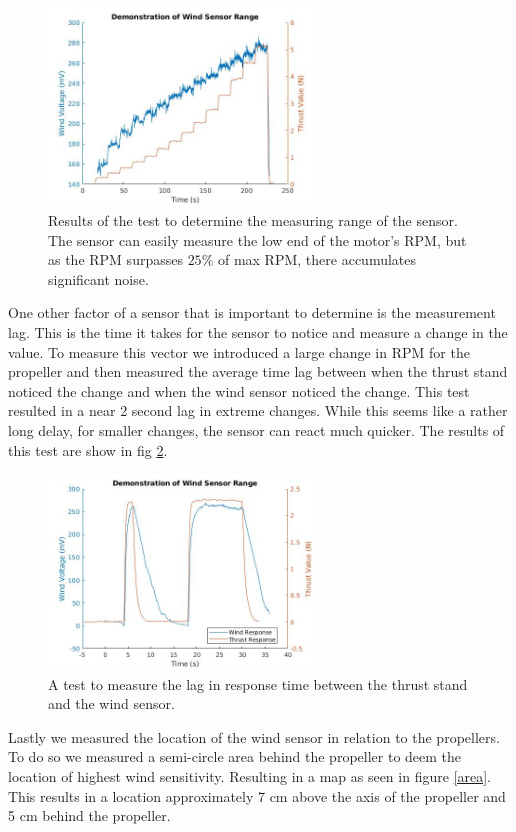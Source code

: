 \documentclass[conference]{IEEEtran}
\begin{document}
	\begin{figure}[htbp]
	\includegraphics[width=7cm]{images/figure_1/range.jpg}
	\caption{Results of the test to determine the measuring range of the sensor. The sensor can easily measure the low end of the motor's RPM, but as the RPM surpasses $25\%$ of max RPM, there accumulates significant noise.  }
	\label{range}
\end{figure}
One other factor of a sensor that is important to determine is the measurement lag. This is the time it takes for the sensor to notice and measure a change in the value. To measure this vector we introduced a large change in RPM for the propeller and then measured the average time lag between when the thrust stand noticed the change and when the wind sensor noticed the change. This test resulted in a near 2 second lag in extreme changes. While this seems like a rather long delay, for smaller changes, the sensor can react much quicker. The results of this test are show in fig \ref{response}.
	\begin{figure}[htbp]
	\includegraphics[width=7cm]{images/figure_1/response.jpg}
	\caption{A test to measure the lag in response time between the thrust stand and the wind sensor.}
	\label{response}
\end{figure}
Lastly we measured the location of the wind sensor in relation to the propellers. To do so we measured a semi-circle area behind the propeller to deem the location of highest wind sensitivity. Resulting in a map as seen in figure \ref{area}. This results in a location approximately 7 cm above the axis of the propeller and 5 cm behind the propeller.
\end{document}
